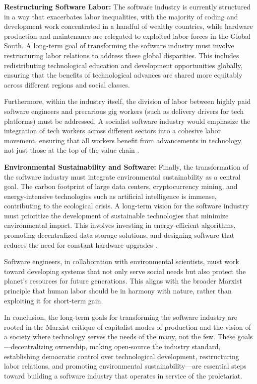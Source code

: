 \begin{refsection}
\textbf{Restructuring Software Labor:}
The software industry is currently structured in a way that exacerbates labor inequalities, with the majority of coding and development work concentrated in a handful of wealthy countries, while hardware production and maintenance are relegated to exploited labor forces in the Global South. A long-term goal of transforming the software industry must involve restructuring labor relations to address these global disparities. This includes redistributing technological education and development opportunities globally, ensuring that the benefits of technological advances are shared more equitably across different regions and social classes.

Furthermore, within the industry itself, the division of labor between highly paid software engineers and precarious gig workers (such as delivery drivers for tech platforms) must be addressed. A socialist software industry would emphasize the integration of tech workers across different sectors into a cohesive labor movement, ensuring that all workers benefit from advancements in technology, not just those at the top of the value chain \cite[pp.~193-196]{scholz2017}.

\textbf{Environmental Sustainability and Software:}
Finally, the transformation of the software industry must integrate environmental sustainability as a central goal. The carbon footprint of large data centers, cryptocurrency mining, and energy-intensive technologies such as artificial intelligence is immense, contributing to the ecological crisis. A long-term vision for the software industry must prioritize the development of sustainable technologies that minimize environmental impact. This involves investing in energy-efficient algorithms, promoting decentralized data storage solutions, and designing software that reduces the need for constant hardware upgrades \cite[pp.~119-122]{schwab2020}.

Software engineers, in collaboration with environmental scientists, must work toward developing systems that not only serve social needs but also protect the planet's resources for future generations. This aligns with the broader Marxist principle that human labor should be in harmony with nature, rather than exploiting it for short-term gain.

In conclusion, the long-term goals for transforming the software industry are rooted in the Marxist critique of capitalist modes of production and the vision of a society where technology serves the needs of the many, not the few. These goals—decentralizing ownership, making open-source the industry standard, establishing democratic control over technological development, restructuring labor relations, and promoting environmental sustainability—are essential steps toward building a software industry that operates in service of the proletariat.


\end{refsection}
